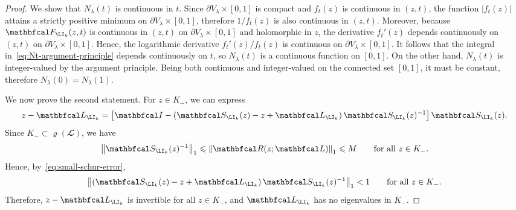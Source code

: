 \documentclass{SciPost}
\begin{document}
\begin{proof}
    We show that \(N_\lambda(t)\) is continuous in \(t\). Since \(\partial V_\lambda \times [0,1]\) is compact and \(f_t(z)\) is continuous in $(z,t)$, the function \(|f_t(z)|\) attains a strictly positive minimum on \(\partial V_\lambda \times [0,1]\), therefore $1 / f_t(z)$ is also continuous in $(z, t)$. Moreover, because \(\mathbfcal F_{\LI_k}(z,t)\) is continuous in \((z,t)\) on \(\partial V_\lambda \times [0,1]\) and holomorphic in \(z\), the derivative \(f_t'(z)\) depends continuously on \((z,t)\) on \(\partial V_\lambda \times [0,1]\). Hence, the logarithmic derivative ${f_t'(z)}/{f_t(z)}$ is continuous on \(\partial V_\lambda \times [0,1]\). It follows that the integral in~\eqref{eq:Nt-argument-principle} depends continuously on \(t\), so \(N_\lambda(t)\) is a continuous function on \([0,1]\). On the other hand, \(N_\lambda(t)\) is integer-valued by the argument principle. Being both continuous and integer-valued on the connected set \([0,1]\), it must be constant, therefore $N_\lambda(0) = N_\lambda(1)$.

    We now prove the second statement. For \(z \in K_-\), we can express
    \begin{equation}
        z-\mathbfcal L_{\LI_k}
        =
        \left[
            \mathbfcal I
            -
            \left(
                \mathbfcal S_{\LI_k}(z)-z+\mathbfcal L_{\LI_k}
            \right)
            \mathbfcal S_{\LI_k}(z)^{-1}
        \right]
    \mathbfcal S_{\LI_k}(z).
    \end{equation}
    Since \(K_- \subset \varrho(\mathbfcal L)\), we have
    \begin{equation}
        \left \|
        \mathbfcal S_{\LI_k}(z)^{-1}
        \right \|_1
        \leqslant
        \left \|
        \mathbfcal R(z;\mathbfcal L)
        \right \|_1
        \leqslant
        M
        \qquad
        \text{for all } z \in K_-.
    \end{equation}
    Hence, by~\eqref{eq:small-schur-error},
    \begin{equation}
        \left \|
        \left(
            \mathbfcal S_{\LI_k}(z)-z+\mathbfcal L_{\LI_k}
        \right)
        \mathbfcal S_{\LI_k}(z)^{-1}
        \right \|_1
        < 1
        \qquad
        \text{for all } z \in K_-.
    \end{equation}
    Therefore, \(z-\mathbfcal L_{\LI_k}\) is invertible for all \(z \in K_-\), and \(\mathbfcal L_{\LI_k}\) has no eigenvalues in \(K_-\).
\end{proof}
\end{document}
